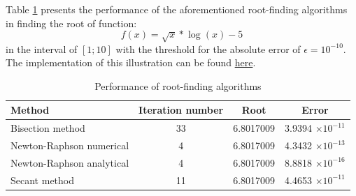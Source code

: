 Table \ref{tab:root_finding} presents the performance of the aforementioned root-finding algorithms in finding the root of function:
\begin{equation}
	f(x) = \sqrt{x} * \log(x) - 5
	\nonumber
\end{equation}
in the interval of $[1;10]$ with the threshold for the absolute error of $\epsilon = 10^{-10}$. The implementation of this illustration can be found \href{https://github.com/chitn/quantfin_study/blob/master/code/root_finding.py}{here}.
\begin{table}[H]
\begin{center}
\caption{Performance of root-finding algorithms}
\label{tab:root_finding}
\begin{tabular}{lccc}
Method                    & Iteration number & Root      & Error                    \\
\hline
Bisection method          & 33               & 6.8017009 & 3.9394 $\times 10^{-11}$ \\
Newton-Raphson numerical  & 4                & 6.8017009 & 4.3432 $\times 10^{-13}$ \\
Newton-Raphson analytical & 4                & 6.8017009 & 8.8818 $\times 10^{-16}$ \\
Secant method             & 11               & 6.8017009 & 4.4653 $\times 10^{-11}$
\end{tabular}
\end{center}
\end{table}

















